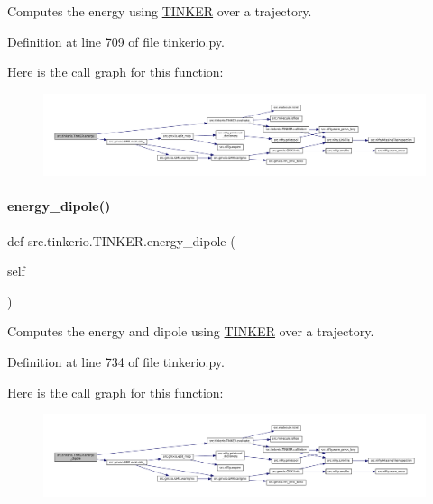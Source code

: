 Computes the energy using \hyperlink{classsrc_1_1tinkerio_1_1TINKER}{T\+I\+N\+K\+ER} over a trajectory. 



Definition at line 709 of file tinkerio.\+py.

Here is the call graph for this function\+:
\nopagebreak
\begin{figure}[H]
\begin{center}
\leavevmode
\includegraphics[width=350pt]{classsrc_1_1tinkerio_1_1TINKER_abf1dfcbc000d41955ceed37115c8591b_cgraph}
\end{center}
\end{figure}
\mbox{\label{classsrc_1_1tinkerio_1_1TINKER_ad288fa120351fbcb05201072f57d4022}} 
\paragraph{\texorpdfstring{energy\+\_\+dipole()}{energy\_dipole()}}
{\footnotesize\ttfamily def src.\+tinkerio.\+T\+I\+N\+K\+E\+R.\+energy\+\_\+dipole (\begin{DoxyParamCaption}\item[{}]{self }\end{DoxyParamCaption})}



Computes the energy and dipole using \hyperlink{classsrc_1_1tinkerio_1_1TINKER}{T\+I\+N\+K\+ER} over a trajectory. 



Definition at line 734 of file tinkerio.\+py.

Here is the call graph for this function\+:
\nopagebreak
\begin{figure}[H]
\begin{center}
\leavevmode
\includegraphics[width=350pt]{classsrc_1_1tinkerio_1_1TINKER_ad288fa120351fbcb05201072f57d4022_cgraph}
\end{center}
\end{figure}
\mbox{\label{classsrc_1_1tinkerio_1_1TINKER_aaa2119b507c4840ed931f1987a133222}} 

